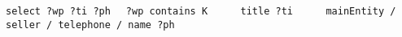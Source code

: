 \verb|select ?wp ?ti ?ph|
\verb|  ?wp contains K|
\verb|     title ?ti|
\verb|     mainEntity / seller / telephone / name ?ph|